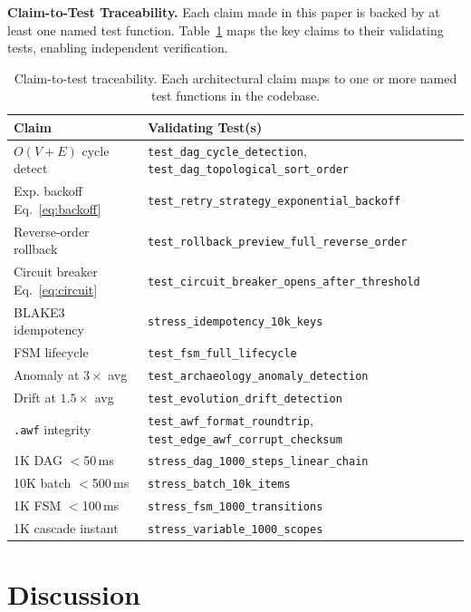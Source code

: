 \documentclass[10pt, twocolumn]{article}
\begin{document}
\textbf{Claim-to-Test Traceability.} Each claim made in this paper is backed by at least one named test function. Table~\ref{tab:traceability} maps the key claims to their validating tests, enabling independent verification.

\begin{table}[t]
\caption{Claim-to-test traceability. Each architectural claim maps to one or more named test functions in the codebase.}
\label{tab:traceability}
\centering\scriptsize
\begin{tabular}{@{}p{2.5cm}p{4.0cm}@{}}
\toprule
\textbf{Claim} & \textbf{Validating Test(s)} \\
\midrule
$O(V{+}E)$ cycle detect & \texttt{test\_dag\_cycle\_detection}, \texttt{test\_dag\_topological\_sort\_order} \\
Exp. backoff Eq.~\ref{eq:backoff} & \texttt{test\_retry\_strategy\_exponential\_backoff} \\
Reverse-order rollback & \texttt{test\_rollback\_preview\_full\_reverse\_order} \\
Circuit breaker Eq.~\ref{eq:circuit} & \texttt{test\_circuit\_breaker\_opens\_after\_threshold} \\
BLAKE3 idempotency & \texttt{stress\_idempotency\_10k\_keys} \\
FSM lifecycle & \texttt{test\_fsm\_full\_lifecycle} \\
Anomaly at $3\times$ avg & \texttt{test\_archaeology\_anomaly\_detection} \\
Drift at $1.5\times$ avg & \texttt{test\_evolution\_drift\_detection} \\
\texttt{.awf} integrity & \texttt{test\_awf\_format\_roundtrip}, \texttt{test\_edge\_awf\_corrupt\_checksum} \\
1K DAG $<$50\,ms & \texttt{stress\_dag\_1000\_steps\_linear\_chain} \\
10K batch $<$500\,ms & \texttt{stress\_batch\_10k\_items} \\
1K FSM $<$100\,ms & \texttt{stress\_fsm\_1000\_transitions} \\
1K cascade instant & \texttt{stress\_variable\_1000\_scopes} \\
\bottomrule
\end{tabular}
\end{table}


\section{Discussion}\label{sec:discussion}
\end{document}
